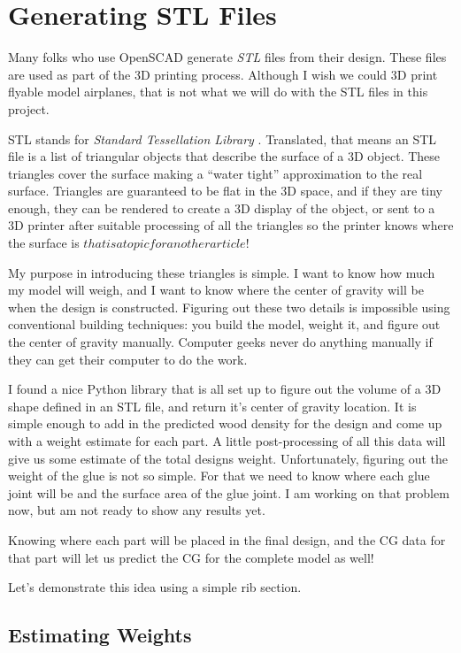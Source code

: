 \section{Generating STL Files}

Many folks who use OpenSCAD generate {\it STL} files from their design. These
files are used as part of the 3D printing process. Although I wish we could 3D
print flyable model airplanes, that is not what we will do with the STL files
in this project.

STL stands for {\it Standard Tessellation Library} \citep{stlwiki}. Translated,
that means an STL file is a list of triangular objects that describe the
surface of a 3D object. These triangles cover the surface making a ``water
tight'' approximation to the real surface. Triangles are guaranteed to be flat
in the 3D space, and if they are tiny enough, they can be rendered to create a
3D display of the object, or sent to a 3D printer after suitable processing of all
the triangles so the printer knows where the surface is \(that is a topic for
another article!\)

My purpose in introducing these triangles is simple. I want to know how much my
model will weigh, and I want to know where the center of gravity will be when
the design is constructed. Figuring out these two details is impossible using
conventional building techniques: you build the model, weight it, and figure
out the center of gravity manually. Computer geeks never do anything manually
if they can get their computer to do the work.

I found a nice Python library that is all set up to figure out the volume of a
3D shape defined in an STL file, and return it's center of gravity location. It
is simple enough to add in the predicted wood density for the design and come
up with a weight estimate for each part. A little post-processing of all this
data will give us some estimate of the total designs weight. Unfortunately,
figuring out the weight of the glue is not so simple. For that we need to know
where each glue joint will be and the surface area of the glue joint. I am
working on that problem now, but am not ready to show any results yet.

Knowing where each part will be placed in the final design, and the CG data for
that part will let us predict the CG for the complete model as well!

Let's demonstrate this idea using a simple rib section.

\subsection{Estimating Weights}

